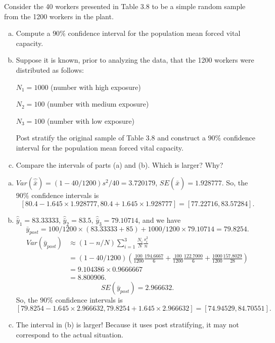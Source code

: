 \documentclass[12pt]{article}
\begin{document}
    \begin{exercise}[Levy-6.4]
        Consider the 40 workers presented in Table 3.8 to be a simple random sample from the 1200 workers in the plant. 
        \begin{enumerate}[a.]
            \item Compute a $90\%$ confidence interval for the population mean forced vital capacity. 
            \item Suppose it is known, prior to analyzing the data, that the 1200 workers were distributed as follows: 
            
            \qquad $N_1=1000$ (number with high exposure)

            \qquad $N_2=100$ (number with medium exposure)

            \qquad $N_3=100$ (number with low exposure)

            Post stratify the original sample of Table 3.8 and construct a $90\%$ confidence interval for the population mean forced vital capacity. 
            \item Compare the intervals of parts (a) and (b). Which is larger? Why? 
        \end{enumerate}
    \end{exercise}

    \begin{solution}
        \begin{enumerate}[a.]
            \item $Var(\hat{\bar{x}})=(1-40/1200)s^2/40=3.720179$, $SE(\hat{\bar{x}})=1.928777$. So, the $90\%$ confidence intervals is
            \[
                [80.4-1.645\times1.928777, 80.4+1.645\times1.928777]=[77.22716, 83.57284].
            \]
            \item $\hat{\bar{y}}_1=83.33333$, $\hat{\bar{y}}_2=83.5$, $\hat{\bar{y}}_3=79.10714$, and we have
            \[
                \bar{y}_{post}=100/1200\times(83.33333+85)+1000/1200\times79.10714=79.8254. 
            \]
            \[
                \begin{aligned}
                    Var(\bar{y}_{post})&\approx (1-n/N)\sum_{i=1}^3\frac{N_i}{N}\frac{s_i^2}{n}\\
                    &=(1-40/1200)\left(\frac{100}{1200}\frac{194.6667}{6}+\frac{100}{1200}\frac{122.7000}{6}+\frac{1000}{1200}\frac{157.8029}{28}\right)\\
                    &=9.104386\times0.9666667\\
                    &=8.800906. 
                \end{aligned}
            \]
            \[
                SE(\bar{y}_{post})=2.966632. 
            \]
            So, the $90\%$ confidence intervals is
            \[
                [79.8254-1.645\times2.966632, 79.8254+1.645\times2.966632]=[74.94529, 84.70551].
            \]
            \item The interval in (b) is larger! Because it uses post stratifying, it may not correspond to the actual situation. 
        \end{enumerate}
    \end{solution}


\end{document}
